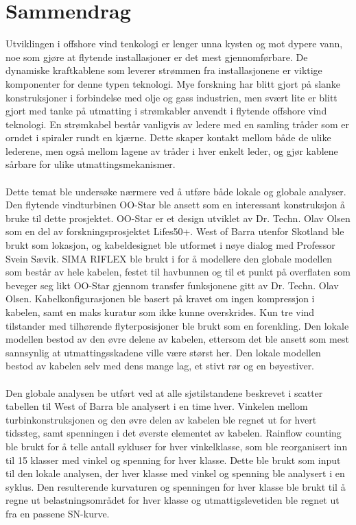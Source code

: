 \chapter*{Sammendrag}
Utviklingen i offshore vind tenkologi er lenger unna kysten og mot dypere vann, noe som gjøre at flytende installasjoner er det mest gjennomførbare. De dynamiske kraftkablene som leverer strømmen fra installasjonene er viktige komponenter for denne typen teknologi. Mye forskning har blitt gjort på slanke konstruksjoner i forbindelse med olje og gass industrien, men svært lite er blitt gjort med tanke på utmatting i strømkabler anvendt i flytende offshore vind teknologi. En strømkabel består vanligvis av ledere med en samling tråder som er orndet i spiraler rundt en kjærne. Dette skaper kontakt mellom både de ulike lederene, men også mellom lagene av tråder i hver enkelt leder, og gjør kablene sårbare for ulike utmattingsmekanismer. \\\\
Dette temat ble undersøke nærmere ved å utføre både lokale og globale analyser. Den flytende vindturbinen OO-Star ble ansett som en interessant konstruksjon å bruke til dette prosjektet. OO-Star er et design utviklet av Dr. Techn. Olav Olsen som en del av forskningsprosjektet Lifes50+. West of Barra utenfor Skotland ble brukt som lokasjon, og kabeldesignet ble utformet i nøye dialog med Professor Svein Sævik. SIMA RIFLEX ble brukt i for å modellere den globale modellen som består av hele kabelen, festet til havbunnen og til et punkt på overflaten som beveger seg likt OO-Star gjennom transfer funksjonene gitt av Dr. Techn. Olav Olsen. Kabelkonfigurasjonen ble basert på kravet om ingen kompressjon i kabelen, samt en maks kuratur som ikke kunne overskrides. Kun tre vind tilstander med tilhørende flyterposisjoner ble brukt som en forenkling. Den lokale modellen bestod av den øvre delene av kabelen, ettersom det ble ansett som mest sannsynlig at utmattingsskadene ville være størst her. Den lokale modellen bestod av kabelen selv med dens mange lag, et stivt rør og en bøyestiver.\\\\
Den globale analysen be utført ved at alle sjøtilstandene beskrevet i scatter tabellen til West of Barra ble analysert i en time hver. Vinkelen mellom turbinkonstruksjonen og den øvre delen av kabelen ble regnet ut for hvert tidssteg, samt spenningen i det øverste elementet av kabelen. Rainflow counting ble brukt for å telle antall sykluser for hver vinkelklasse, som ble reorganisert inn til 15 klasser med vinkel og spenning for hver klasse. Dette ble brukt som input til den lokale analysen, der hver klasse  med vinkel og spenning ble analysert i en syklus. Den resulterende kurvaturen og spenningen for hver klasse ble brukt til å regne ut belastningsområdet for hver klasse og utmattigslevetiden ble regnet ut fra en passene SN-kurve. \\\\

